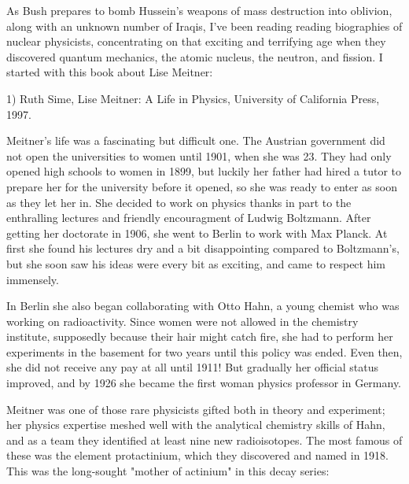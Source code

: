 




As Bush prepares to bomb Hussein's weapons of mass destruction into
oblivion, along with an unknown number of Iraqis, I've been reading
reading biographies of nuclear physicists, concentrating on that
exciting and terrifying age when they discovered quantum mechanics, 
the atomic nucleus, the neutron, and fission.  I started with this book
about Lise Meitner:

1) Ruth Sime, Lise Meitner: A Life in Physics, University of California
Press, 1997.

Meitner's life was a fascinating but difficult one.  The Austrian
government did not open the universities to women until 1901, when she
was 23.  They had only opened high schools to women in 1899, but
luckily her father had hired a tutor to prepare her for the university
before it opened, so she was ready to enter as soon as they let her in.
She decided to work on physics thanks in part to the enthralling
lectures and friendly encouragment of Ludwig Boltzmann.  After getting
her doctorate in 1906, she went to Berlin to work with Max Planck.  At
first she found his lectures dry and a bit disappointing compared to
Boltzmann's, but she soon saw his ideas were every bit as exciting, and
came to respect him immensely.

In Berlin she also began collaborating with Otto Hahn, a young chemist
who was working on radioactivity.  Since women were not allowed in the
chemistry institute, supposedly because their hair might catch fire,
she had to perform her experiments in the basement for two years until
this policy was ended.  Even then, she did not receive any pay at all
until 1911!  But gradually her official status improved, and by 1926 she
became the first woman physics professor in Germany.

Meitner was one of those rare physicists gifted both in theory and
experiment; her physics expertise meshed well with the analytical
chemistry skills of Hahn, and as a team they identified at least nine
new radioisotopes.  The most famous of these was the element
protactinium, which they discovered and named in 1918.  This was the
long-sought "mother of actinium" in this decay series:


